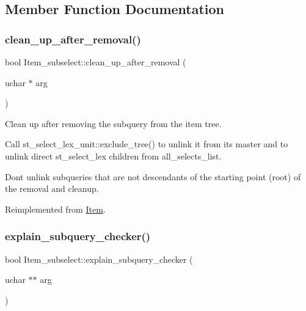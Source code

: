 \subsection{Member Function Documentation}
\mbox{\label{classItem__subselect_a0944e9b89787f5adac23639eb0792d86}} 
\subsubsection{\texorpdfstring{clean\+\_\+up\+\_\+after\+\_\+removal()}{clean\_up\_after\_removal()}}
{\footnotesize\ttfamily bool Item\+\_\+subselect\+::clean\+\_\+up\+\_\+after\+\_\+removal (\begin{DoxyParamCaption}\item[{uchar $\ast$}]{arg }\end{DoxyParamCaption})\hspace{0.3cm}{\ttfamily [virtual]}}

Clean up after removing the subquery from the item tree.

Call st\+\_\+select\+\_\+lex\+\_\+unit\+::exclude\+\_\+tree() to unlink it from its master and to unlink direct st\+\_\+select\+\_\+lex children from all\+\_\+selects\+\_\+list.

Don\textquotesingle{}t unlink subqueries that are not descendants of the starting point (root) of the removal and cleanup. 

Reimplemented from \mbox{\hyperlink{classItem_a649bf72a4ae639e262d147cf5beaa30a}{Item}}.

\mbox{\label{classItem__subselect_afd7dbf2095f70599df0a15fd0de9f9f5}} 
\subsubsection{\texorpdfstring{explain\+\_\+subquery\+\_\+checker()}{explain\_subquery\_checker()}}
{\footnotesize\ttfamily bool Item\+\_\+subselect\+::explain\+\_\+subquery\+\_\+checker (\begin{DoxyParamCaption}\item[{uchar $\ast$$\ast$}]{arg }\end{DoxyParamCaption})\hspace{0.3cm}{\ttfamily [virtual]}}

